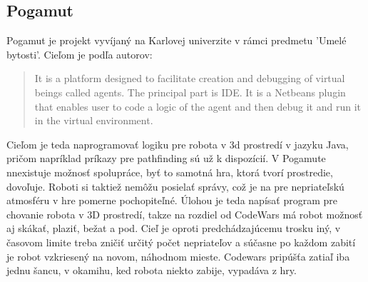 \subsection {Pogamut}
Pogamut je projekt vyvíjaný na Karlovej univerzite v rámci predmetu 'Umelé bytosti'. Cieľom je podľa autorov:\\
\begin{quote}It is a platform designed to facilitate creation and debugging of virtual beings called agents. The principal part is IDE. It is a Netbeans plugin that enables user to code a logic of the agent and then debug it and run it in the virtual environment.
\end{quote}
Cieľom je teda naprogramovať logiku pre robota v 3d prostredí v jazyku Java, pričom napríklad príkazy pre pathfinding sú už k dispozícií. V Pogamute nnexistuje možnosť spolupráce, byť to samotná hra, ktorá tvorí prostredie, dovoľuje. Roboti si taktiež nemôžu posielať správy, což je na pre nepriateľskú atmosféru v hre pomerne pochopiteľné. Úlohou je teda napísať program pre chovanie robota v 3D prostredí, takze na rozdiel od CodeWars má robot možnosť aj skákať, plaziť, bežat a pod. Cieľ je oproti predchádzajúcemu trosku iný, v časovom limite treba zničiť určitý počet nepriateľov a súčasne po každom zabití je robot vzkriesený na novom, náhodnom mieste. Codewars pripúšťa zatiaľ iba jednu šancu, v okamihu, ked robota niekto zabije, vypadáva z hry.%
